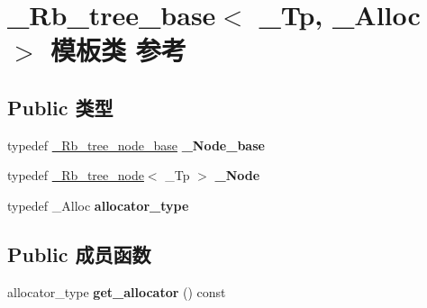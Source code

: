 \hypertarget{class___rb__tree__base}{}\section{\+\_\+\+Rb\+\_\+tree\+\_\+base$<$ \+\_\+\+Tp, \+\_\+\+Alloc $>$ 模板类 参考}
\label{class___rb__tree__base}
\subsection*{Public 类型}
\begin{DoxyCompactItemize}
\item 
\mbox{\label{class___rb__tree__base_a542c616ce943f80ea4d4398cfe7dab7c}} 
typedef \hyperlink{struct___rb__tree__node__base}{\+\_\+\+Rb\+\_\+tree\+\_\+node\+\_\+base} {\bfseries \+\_\+\+Node\+\_\+base}
\item 
\mbox{\label{class___rb__tree__base_a80b0dfc7609cfa566f9271c74fcefb45}} 
typedef \hyperlink{struct___rb__tree__node}{\+\_\+\+Rb\+\_\+tree\+\_\+node}$<$ \+\_\+\+Tp $>$ {\bfseries \+\_\+\+Node}
\item 
\mbox{\label{class___rb__tree__base_a627db0f7b5574c06b1fea286b96d107d}} 
typedef \+\_\+\+Alloc {\bfseries allocator\+\_\+type}
\end{DoxyCompactItemize}
\subsection*{Public 成员函数}
\begin{DoxyCompactItemize}
\item 
\mbox{\label{class___rb__tree__base_a55f3bcce195e5bb0a65cb5b434f72f05}} 
allocator\+\_\+type {\bfseries get\+\_\+allocator} () const
\end{DoxyCompactItemize}
